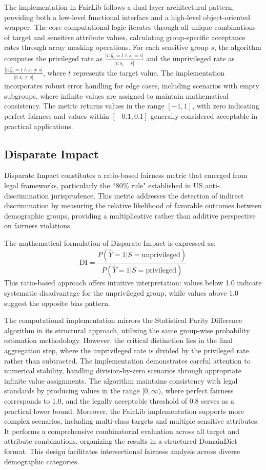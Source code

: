 \documentclass[12pt,a4paper,openright,twoside]{book}
\begin{document}
The implementation in FairLib follows a dual-layer architectural pattern, providing both a low-level functional interface and a high-level object-oriented wrapper. The core computational logic iterates through all unique combinations of target and sensitive attribute values, calculating group-specific acceptance rates through array masking operations. For each sensitive group $s$, the algorithm computes the privileged rate as $\frac{|{i: \hat{y}_i = t \land s_i = s}|}{|{i: s_i = s}|}$ and the unprivileged rate as $\frac{|{i: \hat{y}_i = t \land s_i \neq s}|}{|{i: s_i \neq s}|}$, where $t$ represents the target value. The implementation incorporates robust error handling for edge cases, including scenarios with empty subgroups, where infinite values are assigned to maintain mathematical consistency. The metric returns values in the range $[-1, 1]$, with zero indicating perfect fairness and values within $[-0.1, 0.1]$ generally considered acceptable in practical applications.

\subsection{Disparate Impact}

Disparate Impact constitutes a ratio-based fairness metric that emerged from legal frameworks, particularly the ``80\% rule" established in US anti-discrimination jurisprudence. This metric addresses the detection of indirect discrimination by measuring the relative likelihood of favorable outcomes between demographic groups, providing a multiplicative rather than additive perspective on fairness violations.

The mathematical formulation of Disparate Impact is expressed as:
\begin{equation}
\text{DI} = \frac{P(\hat{Y}=1|S=\text{unprivileged})}{P(\hat{Y}=1|S=\text{privileged})}
\end{equation}
This ratio-based approach offers intuitive interpretation: values below 1.0 indicate systematic disadvantage for the unprivileged group, while values above 1.0 suggest the opposite bias pattern.

The computational implementation mirrors the Statistical Parity Difference algorithm in its structural approach, utilizing the same group-wise probability estimation methodology. However, the critical distinction lies in the final aggregation step, where the unprivileged rate is divided by the privileged rate rather than subtracted. The implementation demonstrates careful attention to numerical stability, handling division-by-zero scenarios through appropriate infinite value assignments. The algorithm maintains consistency with legal standards by producing values in the range $[0, \infty)$, where perfect fairness corresponds to 1.0, and the legally acceptable threshold of 0.8 serves as a practical lower bound. Moreover, the FairLib implementation supports more complex scenarios, including multi-class targets and multiple sensitive attributes. It performs a comprehensive combinatorial evaluation across all target and attribute combinations, organizing the results in a structured DomainDict format. This design facilitates intersectional fairness analysis across diverse demographic categories.
\end{document}
